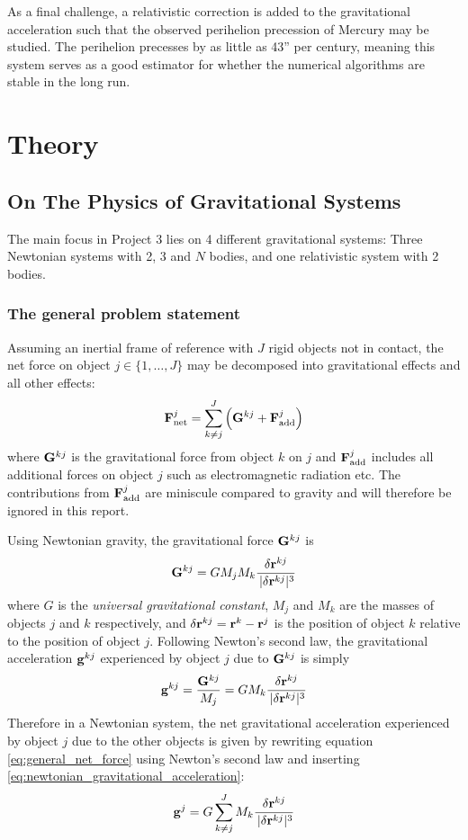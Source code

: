 \documentclass[reprint,english]{revtex4-1}
\begin{document}
As a final challenge, a relativistic correction is added to the gravitational acceleration such that the observed perihelion precession of Mercury may be studied. The perihelion precesses by as little as 43'' per century, meaning this system serves as a good estimator for whether the numerical algorithms are stable in the long run.
\section{Theory}
\subsection{On The Physics of Gravitational Systems}
The main focus in Project 3 lies on 4 different gravitational systems: Three Newtonian systems with 2, 3 and \(N\) bodies, and one relativistic system with 2 bodies.
\subsubsection{The general problem statement}
Assuming an inertial frame of reference with \(J\) rigid objects not in contact, the net force on object \(j\in\{1,\ldots,J\}\) may be decomposed into gravitational effects and all other effects:
\begin{equation}\label{eq:general_net_force}
\vb{F}_\text{net}^j=\sum_{k\neq j}^J\Big(\vb{G}^{kj}+\vb{F}_\text{add}^j\Big)
\end{equation}
where \(\vb{G}^{kj}\) is the gravitational force from object \(k\) on \(j\) and \(\vb{F}_\text{add}^j\) includes all additional forces on object \(j\) such as electromagnetic radiation etc. The contributions from \(\vb{F}_\text{add}^j\) are miniscule compared to gravity and will therefore be ignored in this report.

Using Newtonian gravity, the gravitational force \(\vb{G}^{kj}\) is
\begin{equation}\label{eq:newtonian_gravity}
\vb{G}^{kj}=GM_jM_k\frac{\delta\vb{r}^{kj}}{\,|\delta\vb{r}^{kj}|^3}
\end{equation}
where \(G\) is the \emph{universal gravitational constant}, \(M_j\) and \(M_k\) are the masses of objects \(j\) and \(k\) respectively, and \(\delta\vb{r}^{kj}=\vb{r}^k-\vb{r}^j\) is the position of object \(k\) relative to the position of object \(j\). Following Newton's second law, the gravitational acceleration \(\vb{g}^{kj}\) experienced by object \(j\) due to \(\vb{G}^{kj}\) is simply
\begin{equation}\label{eq:newtonian_gravitational_acceleration}
\vb{g}^{kj}=\frac{\vb{G}^{kj}}{M_j}=GM_k\frac{\delta\vb{r}^{kj}}{\,|\delta\vb{r}^{kj}|^3}
\end{equation}
Therefore in a Newtonian system, the net gravitational acceleration experienced by object \(j\) due to the other objects is given by rewriting equation \eqref{eq:general_net_force} using Newton's second law and inserting \eqref{eq:newtonian_gravitational_acceleration}:
\begin{equation}\label{eq:net_newtonian_gravitational_acceleration}
\vb{g}^j=G\sum_{k\neq j}^JM_k\frac{\delta\vb{r}^{kj}}{\,|\delta\vb{r}^{kj}|^3}
\end{equation}
\end{document}
